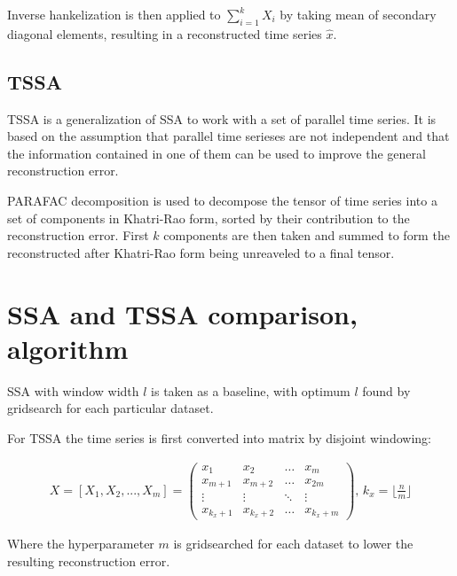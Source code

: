 \documentclass{article}
\begin{document}
Inverse hankelization is then applied to \(\sum_{i=1}^{k}X_i\) by taking mean of secondary diagonal elements, resulting in a reconstructed time series \(\hat{x}\).


\subsection{TSSA}

TSSA is a generalization of SSA to work with a set of parallel time series. It is based on the assumption that parallel time serieses are not independent and that the information contained in one of them can be used to improve the general reconstruction error. 

PARAFAC decomposition is used to decompose the tensor of time series into a set of components in Khatri-Rao form, sorted by their contribution to the reconstruction error. First \(k\) components are then taken and summed to form the reconstructed after Khatri-Rao form being unreaveled to a final tensor.

\section{SSA and TSSA comparison, algorithm}

SSA with window width \(l\) is taken as a baseline, with optimum \(l\) found by gridsearch for each particular dataset.

For TSSA the time series is first converted into matrix by disjoint windowing:

\begin{gather}
X = [X_1, X_2, ..., X_{m}] =
 \begin{pmatrix}
	x_{1} & x_{2} & \dots & x_{m} \\
	x_{m+1} & x_{m+2} & \dots & x_{2m} \\
	\vdots & \vdots & \ddots & \vdots \\
	x_{k_{x}+1} & x_{k_x + 2} &  \dots & x_{k_x + m}
\end{pmatrix} \text{, }
k_x = \lfloor \frac{n}{m} \rfloor
\end{gather}

Where the hyperparameter \(m\) is gridsearched for each dataset to lower the resulting reconstruction error.
\end{document}
